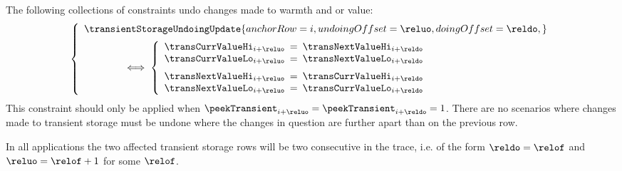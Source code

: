 The following collections of constraints undo changes made to warmth and or value:
\[
	\left\{ \begin{array}{l}
		\transientStorageUndoingUpdate {
			anchorRow     = i      ,
			undoingOffset = \reluo ,
			doingOffset   = \reldo ,
		}
		\vspace{2mm} \\
		\qquad\qquad
		\iff
		\left\{	\begin{array}{lclr}
			\transCurrValueHi _{i + \reluo} & \!\!\! = \!\!\! & \transNextValueHi _{i + \reldo}              \\
			\transCurrValueLo _{i + \reluo} & \!\!\! = \!\!\! & \transNextValueLo _{i + \reldo} \vspace{2mm} \\
			\transNextValueHi _{i + \reluo} & \!\!\! = \!\!\! & \transCurrValueHi _{i + \reldo}              \\
			\transNextValueLo _{i + \reluo} & \!\!\! = \!\!\! & \transCurrValueLo _{i + \reldo}              \\
		\end{array} \right.
		\\
	\end{array} \right.
\]
\saNote{}
This constraint should only be applied when $\peekTransient _{i + \reluo} = \peekTransient _{i + \reldo} = 1$.
There are no scenarios where changes made to transient storage must be undone where the changes in question are further apart than on the previous row.

\saNote{}
In all applications the two affected transient storage rows will be two consecutive in the trace, i.e. of the form $\reldo = \relof$ and $\reluo = \relof + 1$ for some $\relof$.
